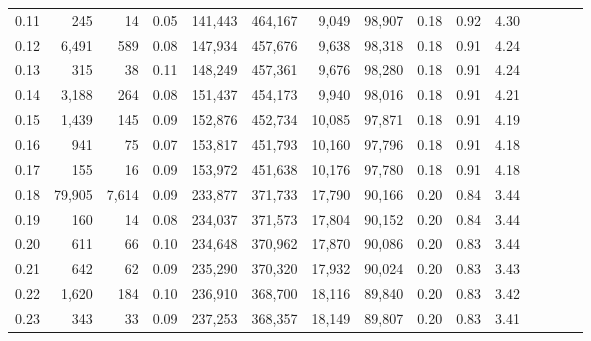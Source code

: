 \begin{tabular}{rrrcrrrrrrrrrrr}
0.11 &     245 &      14 &                                       0.05 &  141,443 &  464,167 &    9,049 &   98,907 &  0.18 &  0.92 &                         4.30 \\
0.12 &   6,491 &     589 &                                       0.08 &  147,934 &  457,676 &    9,638 &   98,318 &  0.18 &  0.91 &                         4.24 \\
0.13 &     315 &      38 &                                       0.11 &  148,249 &  457,361 &    9,676 &   98,280 &  0.18 &  0.91 &                         4.24 \\
0.14 &   3,188 &     264 &                                       0.08 &  151,437 &  454,173 &    9,940 &   98,016 &  0.18 &  0.91 &                         4.21 \\
0.15 &   1,439 &     145 &                                       0.09 &  152,876 &  452,734 &   10,085 &   97,871 &  0.18 &  0.91 &                         4.19 \\
0.16 &     941 &      75 &                                       0.07 &  153,817 &  451,793 &   10,160 &   97,796 &  0.18 &  0.91 &                         4.18 \\
0.17 &     155 &      16 &                                       0.09 &  153,972 &  451,638 &   10,176 &   97,780 &  0.18 &  0.91 &                         4.18 \\
0.18 &  79,905 &   7,614 &                                       0.09 &  233,877 &  371,733 &   17,790 &   90,166 &  0.20 &  0.84 &                         3.44 \\
0.19 &     160 &      14 &                                       0.08 &  234,037 &  371,573 &   17,804 &   90,152 &  0.20 &  0.84 &                         3.44 \\
0.20 &     611 &      66 &                                       0.10 &  234,648 &  370,962 &   17,870 &   90,086 &  0.20 &  0.83 &                         3.44 \\
0.21 &     642 &      62 &                                       0.09 &  235,290 &  370,320 &   17,932 &   90,024 &  0.20 &  0.83 &                         3.43 \\
0.22 &   1,620 &     184 &                                       0.10 &  236,910 &  368,700 &   18,116 &   89,840 &  0.20 &  0.83 &                         3.42 \\
0.23 &     343 &      33 &                                       0.09 &  237,253 &  368,357 &   18,149 &   89,807 &  0.20 &  0.83 &                         3.41 \\

\end{tabular}
